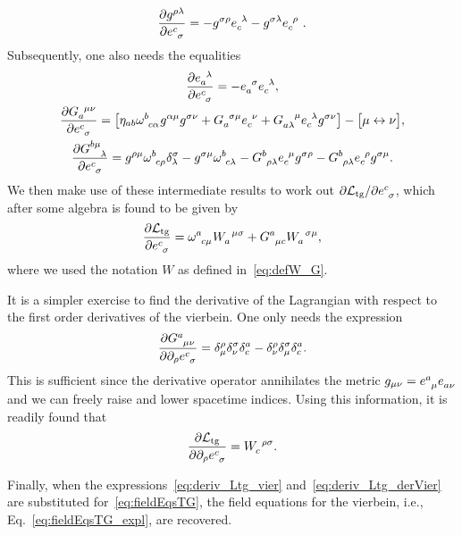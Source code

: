 \documentclass[
final,
11pt,
a4paper,
DIV=11,
headinclude=true,
footinclude=false,
bibliography=totoc,
twoside=true,  %
BCOR=5mm
]{scrbook}
\begin{document}
\begin{subappendices}
\begin{gather*}
  \frac{\pd g^{\rho\lambda}}{\pd e\ind{^c_\sigma}} =
  - g^{\sigma\rho} e\ind{_c^\lambda} - g^{\sigma\lambda} 
  e\ind{_c^\rho}~.
\end{gather*}
Subsequently, one also needs the equalities
\begin{gather*}
  \frac{\pd e\ind{_a^\lambda}}{\pd e\ind{^c_\sigma}} 
  = - e\ind{_a^\sigma} e\ind{_c^\lambda},
  \\
  \frac{\pd G\ind{_a^{\mu\nu}}}{\pd e\ind{^c_\sigma}} = \big[ 
  \eta_{ab} \omega\ind{^b_{c\alpha}} g^{\alpha\mu} g^{\sigma\nu} 
  + G\ind{_a^{\sigma\mu}} e\ind{_c^\nu} + G\ind{_{a\lambda}^\mu} 
  e\ind{_c^\lambda} g^{\sigma\nu} \big] - \big[ \mu 
  \leftrightarrow \nu \big],
  \\
  \frac{\pd G\ind{^{b\mu}_\lambda}}{\pd e\ind{^c_\sigma}}
  = g^{\rho\mu} \omega\ind{^b_{c\rho}} \delta^\sigma_\lambda 
  - g^{\sigma\mu} \omega\ind{^b_{c\lambda}} 
  - G\ind{^b_{\rho\lambda}} e\ind{_c^\mu} g^{\sigma\rho} 
  - G\ind{^b_{\rho\lambda}} e\ind{_c^\rho} g^{\sigma\mu}.
\end{gather*}
We then make use of these intermediate results to work out $\pd 
\mc{L}_\mrm{tg}/\pd e\ind{^c_\sigma}$, which after some algebra 
is found to be given by
\begin{equation}
\label{eq:deriv_Ltg_vier}
  \frac{\pd \mc{L}_\mrm{tg}}{\pd e\ind{^c_\sigma}}
  = \omega\ind{^a_{c\mu}} W\ind{_a^{\mu\sigma}} + G\ind{^a_{\mu 
      c}} W\ind{_a^{\sigma\mu}},
\end{equation}
where we used the notation $W$ as defined in~\eqref{eq:defW_G}.

It is a simpler exercise to find the derivative of the Lagrangian 
with respect to the first order derivatives of the vierbein. One 
only needs the expression
\begin{equation*}
  \frac{\pd G\ind{^a_{\mu\nu}}}{\pd\pd_\rho 
    e\ind{^c_\sigma}} = \delta^\rho_\mu 
  \delta^\sigma_\nu \delta^a_c - \delta^\rho_\nu 
  \delta^\sigma_\mu \delta^a_c.
\end{equation*}
This is sufficient since the derivative operator annihilates the 
metric $g_{\mu\nu} = e\ind{^a_\mu}e\ind{_{a\nu}}$ and 
we can freely raise and lower spacetime indices. Using this 
information, it is readily found that
\begin{equation}
\label{eq:deriv_Ltg_derVier}
  \frac{\pd \mathcal{L}_\mrm{tg}}{\pd\pd_\rho e\ind{^c_\sigma}} 
  = W\ind{_c^{\rho\sigma}}.
\end{equation}

Finally, when the expressions~\eqref{eq:deriv_Ltg_vier} 
and~\eqref{eq:deriv_Ltg_derVier} are substituted 
for~\eqref{eq:fieldEqsTG}, the field equations for the vierbein, 
i.e., Eq.~\eqref{eq:fieldEqsTG_expl}, are recovered.


\end{subappendices}
\end{document}
